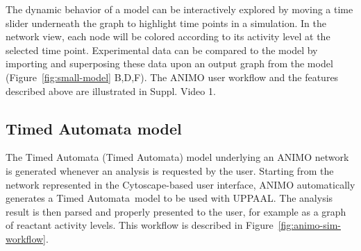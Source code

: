 \documentclass{bmcart}
\def\tas{Timed Automata}
\begin{document}
The dynamic behavior of a model can be interactively explored by
moving a time slider underneath the graph to highlight time points in a simulation. In the network view,
each node will be colored according to its activity level at the selected time point.
Experimental data can be compared to the model by importing and superposing these data
upon an output graph from the model (Figure~\ref{fig:small-model} B,D,F). The ANIMO user workflow and the
features described above are illustrated in Suppl. Video 1.


%
%
%
%




\subsection{Timed Automata model}
The Timed Automata (\tas) model underlying an ANIMO network is generated whenever an analysis is requested by the user.
Starting from the network represented in the Cytoscape-based user interface, ANIMO automatically generates a \tas\ model
to be used with UPPAAL. The analysis result is then parsed and properly presented to the user, for example
as a graph of reactant activity levels. This workflow is described in Figure~\ref{fig:animo-sim-workflow}.
\end{document}
